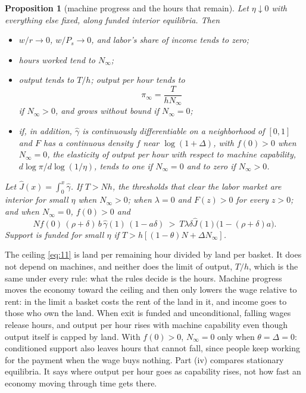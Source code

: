 \documentclass[12pt]{article}
\theoremstyle{plain}
\newtheorem{proposition}{Proposition}
\begin{document}
\begin{proposition}[machine progress and the hours that remain]\label{prop:2}
Let $\eta\downarrow0$ with everything else fixed, along funded interior equilibria. Then
\begin{itemize}\itemsep0pt
\item[(i)] $w/r\to0$, $w/P_s\to0$, and labor's share of income tends to zero;
\item[(ii)] hours worked tend to $N_\infty$;
\item[(iii)] output tends to $T/h$; output per hour tends to
\begin{equation}\label{eq:11}
\pi_\infty=\frac{T}{hN_\infty}
\end{equation}
if $N_\infty>0$, and grows without bound if $N_\infty=0$;
\item[(iv)] if, in addition, $\hat\gamma$ is continuously differentiable on a neighborhood of $[0,1]$ and $F$ has a continuous density $f$ near $\log(1+\Delta)$, with $f(0)>0$ when $N_\infty=0$, the elasticity of output per hour with respect to machine capability, $d\log\pi/d\log(1/\eta)$, tends to one if $N_\infty=0$ and to zero if $N_\infty>0$.
\end{itemize}
Let $\hat J(x)=\int_0^x\hat\gamma$. If $T>Nh$, the thresholds that clear the labor market are interior for small $\eta$ when $N_\infty>0$; when $\lambda=0$ and $F(z)>0$ for every $z>0$; and when $N_\infty=0$, $f(0)>0$ and
\begin{equation}\label{eq:12}
N f(0)\,(\rho+\delta)\,b\,\hat\gamma(1)\,(1-a\delta)\ >\ T\lambda\delta\hat J(1)\bigl(1-(\rho+\delta)a\bigr).
\end{equation}
Support is funded for small $\eta$ if $T>h[(1-\theta)N+\Delta N_\infty]$.
\end{proposition}

The ceiling \eqref{eq:11} is land per remaining hour divided by land per basket. It does not depend on machines, and neither does the limit of output, $T/h$, which is the same under every rule: what the rules decide is the hours. Machine progress moves the economy toward the ceiling and then only lowers the wage relative to rent: in the limit a basket costs the rent of the land in it, and income goes to those who own the land. When exit is funded and unconditional, falling wages release hours, and output per hour rises with machine capability even though output itself is capped by land. With $f(0)>0$, $N_\infty=0$ only when $\theta=\Delta=0$: conditioned support also leaves hours that cannot fall, since people keep working for the payment when the wage buys nothing. Part (iv) compares stationary equilibria. It says where output per hour goes as capability rises, not how fast an economy moving through time gets there.
\end{document}
